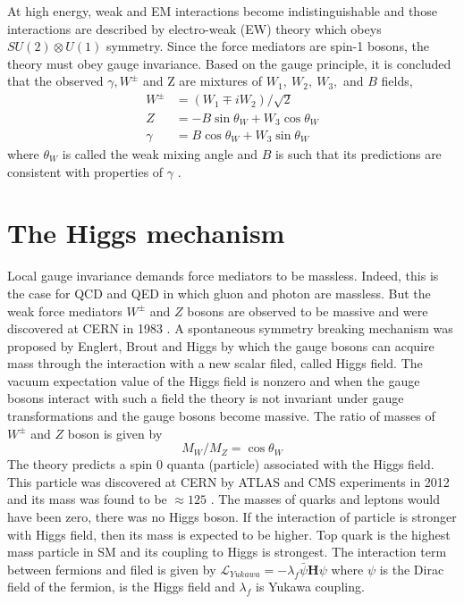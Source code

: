 At high energy, weak and EM interactions become indistinguishable and those interactions are described by electro-weak (EW) theory \cite{PhysRevLett.19.1264}\cite{Salam1959}\cite{Glashow:1959wxa} which obeys $SU(2)\otimes U(1)$ symmetry. Since the force mediators are spin-1 bosons, the theory must obey gauge invariance. Based on the gauge principle, it is concluded that the observed $\gamma, W^\pm$ and Z are mixtures of $W_1,\ W_2,\ W_3,$ and $B$ fields,
\begin{align}
W^\pm & = (W_1 \mp iW_2)/\sqrt{2}\\
Z & = -B\sin\theta_W + W_3\cos\theta_W\\
\gamma &= B\cos\theta_W + W_3\sin\theta_W
\end{align}
where $\theta_W$ is called the weak mixing angle and $B$ is such that its predictions are consistent with properties of $\gamma$ \cite{MartinShaw}.

\section{The Higgs mechanism}
Local gauge invariance demands force mediators to be massless. Indeed, this is the case for QCD and QED in which gluon and photon are massless. But the weak force mediators $W^\pm$ and $Z$ bosons are observed to be massive and were discovered at CERN in 1983 \cite{ARNISON1983103}\cite{BANNER1983476}\cite{1983398}\cite{BAGNAIA1983130}. A spontaneous symmetry breaking mechanism was proposed by Englert, Brout and Higgs \cite{Higgs:1964pj}\cite{Englert:1964et} by which the gauge bosons can acquire mass through the interaction with a new scalar filed, called Higgs field. The vacuum expectation value of the Higgs field is nonzero and when the gauge bosons interact with such a field the theory is not invariant under gauge transformations and the gauge bosons become massive. The ratio of masses of $W^\pm$ and $Z$ boson is given by
\begin{equation}
M_W/M_Z = \cos \theta_W
\end{equation}
The theory predicts a spin 0 quanta (particle) associated with the Higgs field. This particle was discovered at CERN by ATLAS and CMS experiments in 2012 \cite{Aad:2012tfa}\cite{Chatrchyan:2012xdj} and its mass was found to be $\approx 125$ \gev. The masses of quarks and leptons would have been zero, there was no Higgs boson. If the interaction of particle is stronger with Higgs field, then its mass is expected to be higher. Top quark is the highest mass particle in SM and its coupling to Higgs is strongest. The interaction term between fermions and \higgs filed is given by $\mathcal{L}_{Yukawa} = - \lambda_f \bar{\psi}\textbf{H}\psi$ where $\psi$ is the Dirac field of the fermion, \textbf{\higgs} is the Higgs field and $\lambda_f$ is Yukawa coupling.

